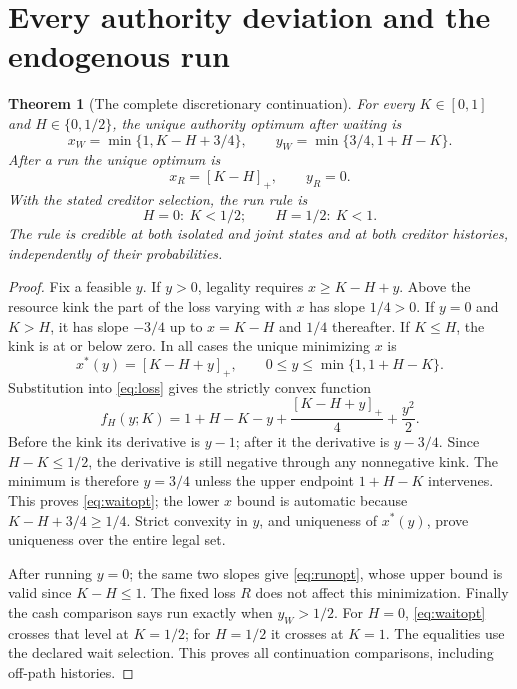 \documentclass[11pt,a4paper]{article}
\numberwithin{equation}{section}
\newtheorem{theorem}{Theorem}[section]
\theoremstyle{definition}
\begin{document}
\section{Every authority deviation and the endogenous run}\label{sec:authority}

\begin{theorem}[The complete discretionary continuation]\label{thm:authority}
For every \(K\in[0,1]\) and \(H\in\{0,1/2\}\), the unique authority
optimum after waiting is
\begin{equation}\label{eq:waitopt}
 x_W=\min\{1,K-H+3/4\},\qquad
 y_W=\min\{3/4,1+H-K\}.
\end{equation}
After a run the unique optimum is
\begin{equation}\label{eq:runopt}
 x_R=[K-H]_+,\qquad y_R=0.
\end{equation}
With the stated creditor selection, the run rule is
\[
 H=0:\ K<1/2;\qquad H=1/2:\ K<1.
\]
The rule is credible at both isolated and joint states and at both
creditor histories, independently of their probabilities.
\end{theorem}
\begin{proof}
Fix a feasible \(y\). If \(y>0\), legality requires \(x\ge K-H+y\).
Above the resource kink the part of the loss varying with \(x\) has
slope \(1/4>0\). If \(y=0\) and \(K>H\), it has slope \(-3/4\) up to
\(x=K-H\) and \(1/4\) thereafter. If \(K\le H\), the kink is at or
below zero. In all cases the unique minimizing \(x\) is
\[
 x^*(y)=[K-H+y]_+,
 \qquad 0\le y\le\min\{1,1+H-K\}.
\]
Substitution into \eqref{eq:loss} gives the strictly convex function
\begin{equation}\label{eq:reduced}
 f_H(y;K)=1+H-K-y+\frac{[K-H+y]_+}{4}+\frac{y^2}{2}.
\end{equation}
Before the kink its derivative is \(y-1\); after it the derivative is
\(y-3/4\). Since \(H-K\le1/2\), the derivative is still negative
through any nonnegative kink. The minimum is therefore \(y=3/4\)
unless the upper endpoint \(1+H-K\) intervenes. This proves
\eqref{eq:waitopt}; the lower \(x\) bound is automatic because
\(K-H+3/4\ge1/4\). Strict convexity in \(y\), and uniqueness of \(x^*(y)\),
prove uniqueness over the entire legal set.

After running \(y=0\); the same two slopes give \eqref{eq:runopt},
whose upper bound is valid since \(K-H\le1\). The fixed loss \(R\)
does not affect this minimization. Finally the cash comparison says
run exactly when \(y_W>1/2\). For \(H=0\), \eqref{eq:waitopt} crosses
that level at \(K=1/2\); for \(H=1/2\) it crosses at \(K=1\).
The equalities use the declared wait selection. This proves all
continuation comparisons, including off-path histories.
\end{proof}
\end{document}
